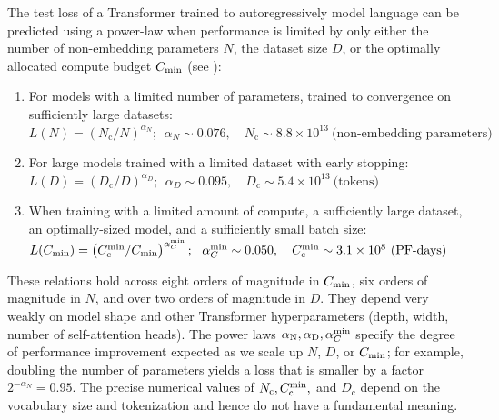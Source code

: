 The test loss of a Transformer trained to autoregressively model language can be predicted using a power-law  when performance is limited by only either the number of non-embedding parameters $N$, the dataset size $D$, or the optimally allocated compute budget $C_{\rm min}$ (see ):
\begin{enumerate}
\setlength\itemsep{0.5em}
\item For models with a limited number of parameters, trained to convergence on sufficiently large datasets:
$L(N) = \left(N_{\mathrm{c}}/N\right)^{\alpha_N};~~ \alpha_N \sim 0.076, \quad N_{\mathrm{c}} \sim 8.8 \times 10^{13}~\text{(non-embedding parameters)} \label{eq:crit_n}$
\item For large models trained with a limited dataset with early stopping:
$L(D) = \left(D_{\mathrm{c}}/D\right)^{\alpha_D};~~ \alpha_D \sim 0.095, \quad D_{\mathrm{c}} \sim 5.4 \times 10^{13}~\text{(tokens)} \label{eq:crit_d}$
\item When training with a limited amount of compute, a sufficiently large dataset, an optimally-sized model, and a sufficiently small batch size:
$L(C_{\rm min}) = \left(C_{\mathrm{c}}^{\rm min} / C_{\rm min}\right)^{\alpha_C^{\rm min}};~~ \alpha_C^{\rm min} \sim 0.050, \quad C_{\mathrm{c}}^{\rm min} \sim 3.1 \times 10^{8}~\text{(PF-days)} \label{eq:crit_c}$
\end{enumerate}

These relations hold across eight orders of magnitude in $C_{\rm min}$, six orders of magnitude in $N$, and over two orders of magnitude in $D$.  They depend very weakly on model shape and other Transformer hyperparameters (depth, width, number of self-attention heads).   The power laws $\alpha_{\rm N}, \alpha_{\rm D}, \alpha_{C}^{\rm min}$ specify the degree of performance improvement expected as we scale up $N$, $D$, or $C_{\rm min}$; for example, doubling the number of parameters yields a loss that is smaller by a factor $2^{-\alpha_N}=0.95$. The precise numerical values of $N_{\mathrm{c}}, C_{\rm c}^{\rm min},$ and $D_{\mathrm{c}}$ depend on the vocabulary size and tokenization and hence do not have a fundamental meaning.  




